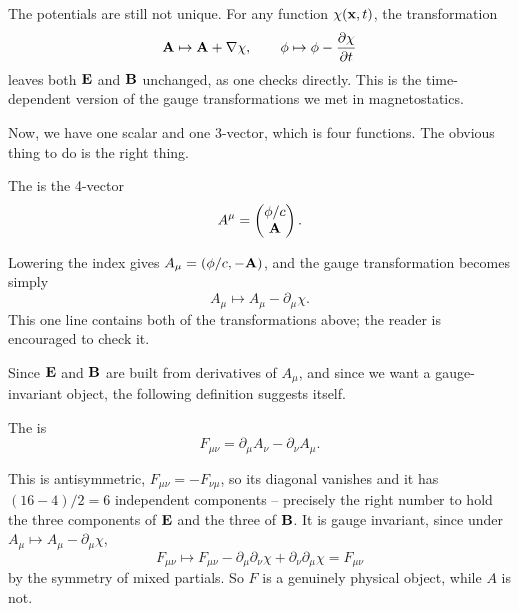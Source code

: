 \documentclass[a4paper]{scrartcl}
\begin{document}
The potentials are still not unique. For any function $\chi(\mathbf{x},t)$, the transformation
$$
\mathbf{A}\mapsto \mathbf{A}+\nabla\chi, \qquad \phi \mapsto \phi - \frac{\partial\chi}{\partial t}
$$
leaves both $\mathbf{E}$ and $\mathbf{B}$ unchanged, as one checks directly. This is the time-dependent version of the gauge transformations we met in magnetostatics.

Now, we have one scalar and one 3-vector, which is four functions. The obvious thing to do is the right thing.

\begin{definition}[4-potential]
	The  is the 4-vector
	$$
	A^\mu = \begin{pmatrix} \phi/c\\ \mathbf{A}\end{pmatrix}.
	$$
\end{definition}

Lowering the index gives $A_\mu = (\phi/c, -\mathbf{A})$, and the gauge transformation becomes simply
$$
A_\mu \mapsto A_\mu - \partial_\mu \chi.
$$
This one line contains both of the transformations above; the reader is encouraged to check it.

Since $\mathbf{E}$ and $\mathbf{B}$ are built from derivatives of $A_\mu$, and since we want a gauge-invariant object, the following definition suggests itself.

\begin{definition}
	The  is
	$$
	F_{\mu\nu} = \partial_\mu A_\nu - \partial_\nu A_\mu.
	$$
\end{definition}

This is antisymmetric, $F_{\mu\nu} = -F_{\nu\mu}$, so its diagonal vanishes and it has $(16-4)/2 = 6$ independent components -- precisely the right number to hold the three components of $\mathbf{E}$ and the three of $\mathbf{B}$. It is gauge invariant, since under $A_\mu\mapsto A_\mu - \partial_\mu\chi$,
$$
F_{\mu\nu}\mapsto F_{\mu\nu} - \partial_\mu\partial_\nu \chi + \partial_\nu\partial_\mu\chi = F_{\mu\nu}
$$
by the symmetry of mixed partials. So $F$ is a genuinely physical object, while $A$ is not.
\end{document}
